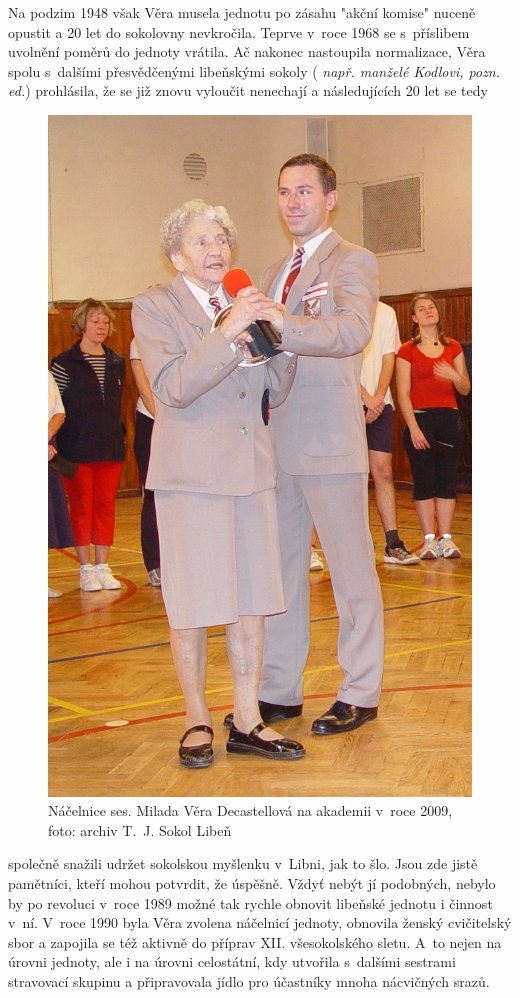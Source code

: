 \documentclass[a5paper, 11pt, twoside]{article}
\newcommand{\pozned}[1]{%
\textit{#1}}
\begin{document}
Na podzim 1948 však Věra musela jednotu po zásahu "akční komise" nuceně
opustit a 20 let do sokolovny nevkročila. Teprve v~roce 1968 se
s~příslibem uvolnění poměrů do jednoty vrátila. Ač nakonec nastoupila
normalizace, Věra spolu s~dalšími přesvědčenými libeňskými sokoly
(\pozned{např. manželé Kodlovi, pozn. ed.}) prohlásila, že se již znovu
vyloučit nenechají a následujících 20 let se tedy
\begin{figure}
  \centering 
  \includegraphics[width=0.9\linewidth]{img/73_vera_cedok.JPG}
  \caption*{Náčelnice ses. Milada Věra Decastellová na akademii v~roce 2009,
  foto: archiv T.~J. Sokol Libeň}
\end{figure}
společně snažili
udržet sokolskou myšlenku v~Libni, jak to šlo. Jsou zde jistě pamětníci,
kteří mohou potvrdit, že úspěšně. Vždyť nebýt jí podobných, nebylo by po
revoluci v~roce 1989 možné tak rychle obnovit libeňské jednotu i činnost
v~ní. V~roce 1990 byla Věra zvolena náčelnicí jednoty, obnovila ženský
cvičitelský sbor a zapojila se též aktivně do příprav XII. všesokolského
sletu. A~to nejen na úrovni jednoty, ale i na úrovni celostátní, kdy
utvořila s~dalšími sestrami stravovací skupinu a připravovala jídlo pro
účastníky mnoha nácvičných srazů.
\end{document}
